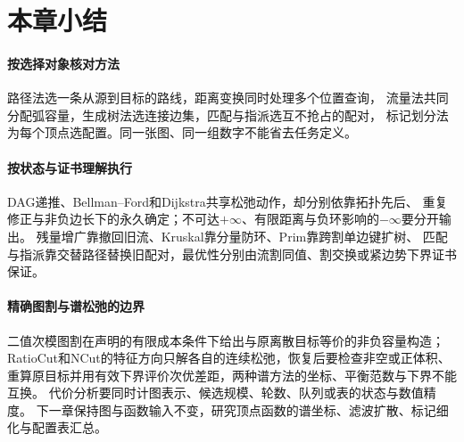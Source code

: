 \section{本章小结}

\paragraph{按选择对象核对方法}
路径法选一条从源到目标的路线，距离变换同时处理多个位置查询，
流量法共同分配弧容量，生成树法选连接边集，匹配与指派选互不抢占的配对，
标记划分法为每个顶点选配置。同一张图、同一组数字不能省去任务定义。

\paragraph{按状态与证书理解执行}
DAG递推、Bellman--Ford和Dijkstra共享松弛动作，却分别依靠拓扑先后、
重复修正与非负边长下的永久确定；不可达$+\infty$、有限距离与负环影响的$-\infty$要分开输出。
残量增广靠撤回旧流、Kruskal靠分量防环、Prim靠跨割单边键扩树、
匹配与指派靠交替路径替换旧配对，最优性分别由流割同值、割交换或紧边势下界证书保证。

\paragraph{精确图割与谱松弛的边界}
二值次模图割在声明的有限成本条件下给出与原离散目标等价的非负容量构造；
RatioCut和NCut的特征方向只解各自的连续松弛，恢复后要检查非空或正体积、
重算原目标并用有效下界评价次优差距，两种谱方法的坐标、平衡范数与下界不能互换。
代价分析要同时计图表示、候选规模、轮数、队列或表的状态与数值精度。
下一章保持图与函数输入不变，研究顶点函数的谱坐标、滤波扩散、标记细化与配置表汇总。
